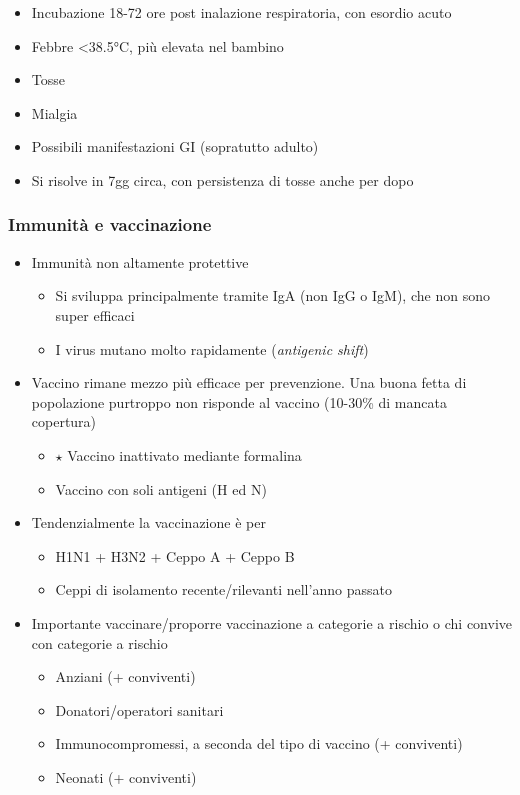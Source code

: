 \documentclass[italian,]{article}
\providecommand{\tightlist}{%
  \setlength{\itemsep}{0pt}\setlength{\parskip}{0pt}}
\newcommand{\goldstandard}{\textcircled{$\star$} }                      %
\begin{document}
\begin{itemize}
\tightlist
\item
  Incubazione 18-72 ore post inalazione respiratoria, con esordio acuto
\item
  Febbre \textless{}38.5°C, più elevata nel bambino
\item
  Tosse
\item
  Mialgia
\item
  Possibili manifestazioni GI (sopratutto adulto)
\item
  Si risolve in 7gg circa, con persistenza di tosse anche per dopo
\end{itemize}

\hypertarget{immunituxe0-e-vaccinazione}{%
\subsubsection{Immunità e
vaccinazione}\label{immunituxe0-e-vaccinazione}}

\begin{itemize}
\tightlist
\item
  Immunità non altamente protettive

  \begin{itemize}
  \tightlist
  \item
    Si sviluppa principalmente tramite IgA (non IgG o IgM), che non sono
    super efficaci
  \item
    I virus mutano molto rapidamente (\emph{antigenic shift})
  \end{itemize}
\item
  Vaccino rimane mezzo più efficace per prevenzione. Una buona fetta di
  popolazione purtroppo non risponde al vaccino (10-30\% di mancata
  copertura)

  \begin{itemize}
  \tightlist
  \item
    \goldstandard Vaccino inattivato mediante formalina
  \item
    Vaccino con soli antigeni (H ed N)
  \end{itemize}
\item
  Tendenzialmente la vaccinazione è per

  \begin{itemize}
  \tightlist
  \item
    H1N1 + H3N2 + Ceppo A + Ceppo B
  \item
    Ceppi di isolamento recente/rilevanti nell'anno passato
  \end{itemize}
\item
  Importante vaccinare/proporre vaccinazione a categorie a rischio o chi
  convive con categorie a rischio

  \begin{itemize}
  \tightlist
  \item
    Anziani (+ conviventi)
  \item
    Donatori/operatori sanitari
  \item
    Immunocompromessi, a seconda del tipo di vaccino (+ conviventi)
  \item
    Neonati (+ conviventi)
  \end{itemize}
\end{itemize}
\end{document}

